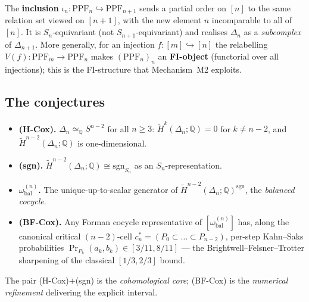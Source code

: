 \documentclass[11pt,reqno]{amsart}
\theoremstyle{plain}
\theoremstyle{definition}
\newcommand{\PPF}{\mathrm{PPF}}
\newcommand{\Hred}{\widetilde H}
\newcommand{\sgn}{\mathrm{sgn}}
\newcommand{\Q}{\mathbb{Q}}
\newcommand{\omegabal}[1]{\omega_{\mathrm{bal}}^{(#1)}}
\newcommand{\cstar}[1]{c^{*}_{#1}}
\begin{document}
The \textbf{inclusion} $\iota_n:\PPF_n\hookrightarrow\PPF_{n+1}$ sends a
partial order on $[n]$ to the same relation set viewed on $[n+1]$, with
the new element $n$ incomparable to all of $[n]$. It is
$S_n$-equivariant (not $S_{n+1}$-equivariant) and realises $\Delta_n$ as
a \emph{subcomplex} of $\Delta_{n+1}$. More generally, for an injection
$f:[m]\hookrightarrow[n]$ the relabelling
$V(f):\PPF_m\to\PPF_n$ makes $(\PPF_n)_n$ an \textbf{FI-object}
(functorial over all injections); this is the FI-structure that
Mechanism~M2 exploits.

\subsection{The conjectures}\label{ssec:conjectures}
\begin{itemize}[leftmargin=1.6em]
  \item \textbf{(H-Cox).} $\Delta_n\simeq_{\Q}S^{n-2}$ for all
        $n\ge3$: $\Hred^k(\Delta_n;\Q)=0$ for $k\ne n-2$, and
        $\Hred^{n-2}(\Delta_n;\Q)$ is one-dimensional.
  \item \textbf{(sgn).} $\Hred^{n-2}(\Delta_n;\Q)\cong\sgn_{S_n}$ as an
        $S_n$-representation.
  \item \textbf{$\omegabal{n}$.} The unique-up-to-scalar generator of
        $\Hred^{n-2}(\Delta_n;\Q)^{\sgn}$, the \emph{balanced cocycle}.
  \item \textbf{(BF-Cox).} Any Forman cocycle representative of
        $[\omegabal{n}]$ has, along the canonical critical $(n-2)$-cell
        $\cstar n=(P_0\subset\dots\subset P_{n-2})$, per-step Kahn--Saks
        probabilities $\Pr_{P_k}(a_k,b_k)\in[3/11,8/11]$ --- the
        Brightwell--Felsner--Trotter sharpening of the classical
        $[1/3,2/3]$ bound.
\end{itemize}
The pair (H-Cox)$+$(sgn) is the \emph{cohomological core}; (BF-Cox) is
the \emph{numerical refinement} delivering the explicit interval.
\end{document}
